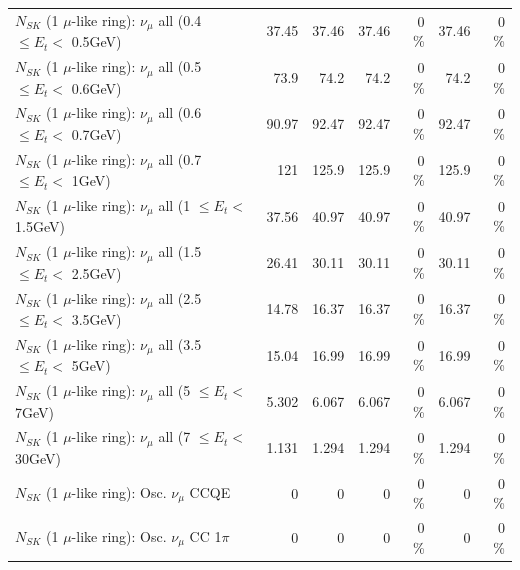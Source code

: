 \begin{table}
\begin{tabular}{| l | r | r | r  r | r  r |}
       $N_{SK}$ (1 $\mu$-like ring): $\nu_{\mu}$ all (0.4 $\leq E_{t} <$ 0.5GeV) &           37.45 &           37.46 &           37.46 &        0 \%  &           37.46 &        0 \%  \\ 
       $N_{SK}$ (1 $\mu$-like ring): $\nu_{\mu}$ all (0.5 $\leq E_{t} <$ 0.6GeV) &            73.9 &            74.2 &            74.2 &        0 \%  &            74.2 &        0 \%  \\ 
       $N_{SK}$ (1 $\mu$-like ring): $\nu_{\mu}$ all (0.6 $\leq E_{t} <$ 0.7GeV) &           90.97 &           92.47 &           92.47 &        0 \%  &           92.47 &        0 \%  \\ 
         $N_{SK}$ (1 $\mu$-like ring): $\nu_{\mu}$ all (0.7 $\leq E_{t} <$ 1GeV) &             121 &           125.9 &           125.9 &        0 \%  &           125.9 &        0 \%  \\ 
         $N_{SK}$ (1 $\mu$-like ring): $\nu_{\mu}$ all (1 $\leq E_{t} <$ 1.5GeV) &           37.56 &           40.97 &           40.97 &        0 \%  &           40.97 &        0 \%  \\ 
       $N_{SK}$ (1 $\mu$-like ring): $\nu_{\mu}$ all (1.5 $\leq E_{t} <$ 2.5GeV) &           26.41 &           30.11 &           30.11 &        0 \%  &           30.11 &        0 \%  \\ 
       $N_{SK}$ (1 $\mu$-like ring): $\nu_{\mu}$ all (2.5 $\leq E_{t} <$ 3.5GeV) &           14.78 &           16.37 &           16.37 &        0 \%  &           16.37 &        0 \%  \\ 
         $N_{SK}$ (1 $\mu$-like ring): $\nu_{\mu}$ all (3.5 $\leq E_{t} <$ 5GeV) &           15.04 &           16.99 &           16.99 &        0 \%  &           16.99 &        0 \%  \\ 
           $N_{SK}$ (1 $\mu$-like ring): $\nu_{\mu}$ all (5 $\leq E_{t} <$ 7GeV) &           5.302 &           6.067 &           6.067 &        0 \%  &           6.067 &        0 \%  \\ 
          $N_{SK}$ (1 $\mu$-like ring): $\nu_{\mu}$ all (7 $\leq E_{t} <$ 30GeV) &           1.131 &           1.294 &           1.294 &        0 \%  &           1.294 &        0 \%  \\ 
\hline
\hline
                               $N_{SK}$ (1 $\mu$-like ring): Osc. $\nu_\mu$ CCQE &               0 &               0 &               0 &        0 \%  &               0 &        0 \%  \\ 
                          $N_{SK}$ (1 $\mu$-like ring): Osc. $\nu_\mu$ CC 1$\pi$ &               0 &               0 &               0 &        0 \%  &               0 &        0 \%  \\ 

\end{tabular}
\end{table}
